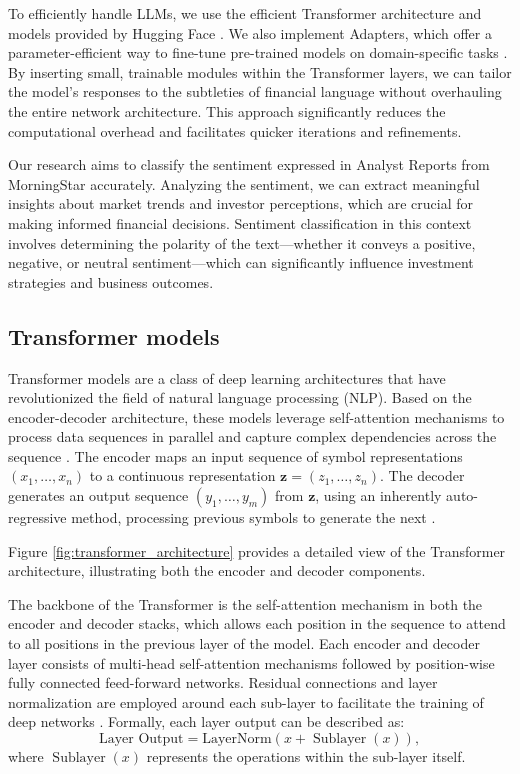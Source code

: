 \documentclass[conference]{IEEEtran}
\begin{document}
To efficiently handle LLMs, we use the efficient Transformer architecture and models provided by Hugging Face \cite{wolf2020huggingfaces}. We also implement Adapters, which offer a parameter-efficient way to fine-tune pre-trained models on domain-specific tasks \cite{pfeiffer2020adapterhub}. By inserting small, trainable modules within the Transformer layers, we can tailor the model's responses to the subtleties of financial language without overhauling the entire network architecture. This approach significantly reduces the computational overhead and facilitates quicker iterations and refinements.

Our research aims to classify the sentiment expressed in Analyst Reports from MorningStar accurately. Analyzing the sentiment, we can extract meaningful insights about market trends and investor perceptions, which are crucial for making informed financial decisions. Sentiment classification in this context involves determining the polarity of the text—whether it conveys a positive, negative, or neutral sentiment—which can significantly influence investment strategies and business outcomes.

\subsection{Transformer models}%
Transformer models are a class of deep learning architectures that have revolutionized the field of natural language processing (NLP). Based on the encoder-decoder architecture, these models leverage self-attention mechanisms to process data sequences in parallel and capture complex dependencies across the sequence \cite{Vaswani2023} \cite{wolf2020huggingfaces}. The encoder maps an input sequence of symbol representations $(x_1, \ldots, x_n)$ to a continuous representation $\mathbf{z}=(z_1, \ldots, z_n)$. The decoder generates an output sequence $(y_1, \ldots, y_m)$ from $\mathbf{z}$, using an inherently auto-regressive method, processing previous symbols to generate the next \cite{Vaswani2023}.

Figure \ref{fig:transformer_architecture} provides a detailed view of the Transformer architecture, illustrating both the encoder and decoder components.

The backbone of the Transformer is the self-attention mechanism in both the encoder and decoder stacks, which allows each position in the sequence to attend to all positions in the previous layer of the model. Each encoder and decoder layer consists of multi-head self-attention mechanisms followed by position-wise fully connected feed-forward networks. Residual connections and layer normalization are employed around each sub-layer to facilitate the training of deep networks \cite{Vaswani2023}. Formally, each layer output can be described as:
\[
\text{Layer Output} = \text{LayerNorm}(x + \operatorname{Sublayer}(x)),
\]
where $\operatorname{Sublayer}(x)$ represents the operations within the sub-layer itself.
\end{document}
